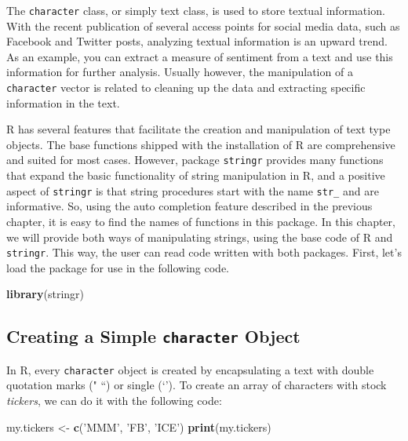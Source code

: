 \documentclass[11pt,]{book}
\newenvironment{Shaded}{\begin{snugshade}}{\end{snugshade}}
\newcommand{\KeywordTok}[1]{\textcolor[rgb]{0.27,0.27,0.27}{\textbf{#1}}}
\newcommand{\StringTok}[1]{\textcolor[rgb]{0.5,0.5,0.5}{#1}}
\newcommand{\NormalTok}[1]{#1}
\begin{document}
The \texttt{character} class, or simply text class, is used to store
textual information. With the recent publication of several access
points for social media data, such as Facebook and Twitter posts,
analyzing textual information is an upward trend. As an example, you can
extract a measure of sentiment from a text and use this information for
further analysis. Usually however, the manipulation of a
\texttt{character} vector is related to cleaning up the data and
extracting specific information in the text.

R has several features that facilitate the creation and manipulation of
text type objects. The base functions shipped with the installation of R
are comprehensive and suited for most cases. However, package
\texttt{stringr} \citep{stringr} provides many functions that expand the
basic functionality of string manipulation in R, and a positive aspect
of \texttt{stringr} is that string procedures start with the name
\texttt{str\_} and are informative. So, using the auto completion
feature described in the previous chapter, it is easy to find the names
of functions in this package. In this chapter, we will provide both ways
of manipulating strings, using the base code of R and \texttt{stringr}.
This way, the user can read code written with both packages. First,
let's load the package for use in the following code. 

\begin{Shaded}
\begin{Highlighting}[]
\KeywordTok{library}\NormalTok{(stringr)}
\end{Highlighting}
\end{Shaded}

\subsection{\texorpdfstring{Creating a Simple \texttt{character}
Object}{Creating a Simple character Object}}\label{creating-a-simple-character-object}

In R, every \texttt{character} object is created by encapsulating a text
with double quotation marks (" ``) or single (`'). To create an array of
characters with stock \emph{tickers}, we can do it with the following
code: 

\begin{Shaded}
\begin{Highlighting}[]
\NormalTok{my.tickers <-}\StringTok{ }\KeywordTok{c}\NormalTok{(}\StringTok{'MMM'}\NormalTok{, }\StringTok{'FB'}\NormalTok{, }\StringTok{'ICE'}\NormalTok{)}
\KeywordTok{print}\NormalTok{(my.tickers)}
\end{Highlighting}
\end{Shaded}
\end{document}
